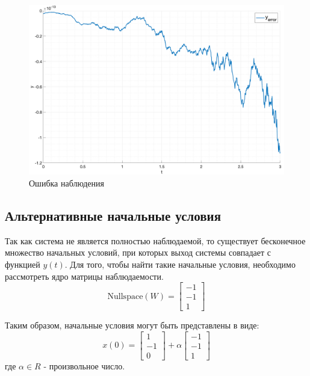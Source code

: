\begin{figure}
    \centering
    \includegraphics[width=\textwidth]{media/plots/task4_error.png}
    \caption{Ошибка наблюдения}
    \label{fig:task4_estimation}
\end{figure}

\FloatBarrier
\subsection{Альтернативные начальные условия} 
Так как система не является полностью наблюдаемой, то существует бесконечное множество начальных условий,
при которых выход системы совпадает с функцией $y(t)$. Для того, чтобы найти такие начальные условия, необходимо
рассмотреть ядро матрицы наблюдаемости.
\begin{equation}
    \text{Nullspace}(W) = \begin{bmatrix}
        -1 \\ -1 \\ 1
    \end{bmatrix}
\end{equation}

Таким образом, начальные условия могут быть представлены в виде: 
\begin{equation}
    x(0) = \begin{bmatrix}
        1 \\ -1 \\ 0
    \end{bmatrix} + \alpha \begin{bmatrix}
        -1 \\ -1 \\ 1
    \end{bmatrix}
\end{equation}
где $\alpha \in R$ - произвольное число.


